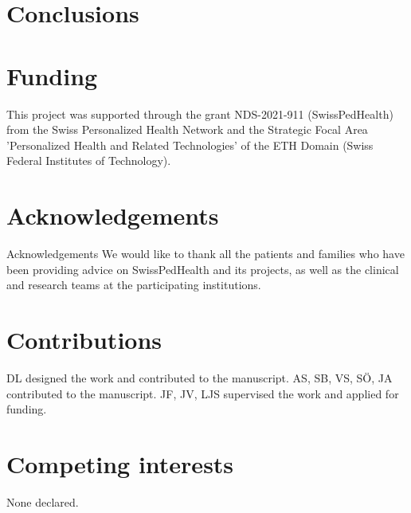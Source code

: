 \FloatBarrier


 
\section{Conclusions}

\section{Funding}
This project was supported through the grant NDS-2021-911 (SwissPedHealth) from the Swiss Personalized Health Network and the Strategic Focal Area 'Personalized Health and Related Technologies' of the ETH Domain (Swiss Federal Institutes of Technology).

\section{Acknowledgements}
Acknowledgements We would like to thank all the patients and families who have been providing advice on SwissPedHealth and its projects, as well as the clinical and research teams at the participating institutions.

\section{Contributions}
DL designed the work and contributed to the manuscript.
AS, SB, VS, SÖ, JA contributed to the manuscript.
JF, JV, LJS supervised the work and applied for funding.

\section{Competing interests}
None declared.

